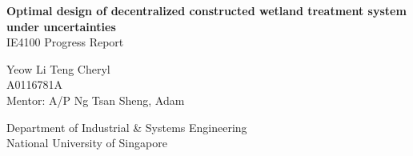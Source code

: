 \documentclass[preprint,12pt,authoryear]{elsarticle}
\begin{document}
\setlength{\abovedisplayskip}{3pt}
\setlength{\belowdisplayskip}{3pt}

\begin{titlepage}
    \begin{center}
        \vspace*{1cm}
        
        \Huge
	 \textbf{Optimal design of decentralized constructed wetland treatment system under uncertainties}\\        
	 \noindent\makebox[\linewidth]{\rule{0.7\paperwidth}{0.4pt}}
        \vspace{0.5cm}
        \LARGE
        IE4100 Progress Report
        
        \vspace{1.5cm}
        
        Yeow Li Teng Cheryl\\
	  A0116781A\\
	  Mentor: A/P Ng Tsan Sheng, Adam
        
        \vfill
        
        
        \vspace{0.8cm}
        
        
        \Large
        Department of Industrial \& Systems Engineering\\
        National University of Singapore\\
        
    \end{center}
\end{titlepage}

	

	




\end{document}
